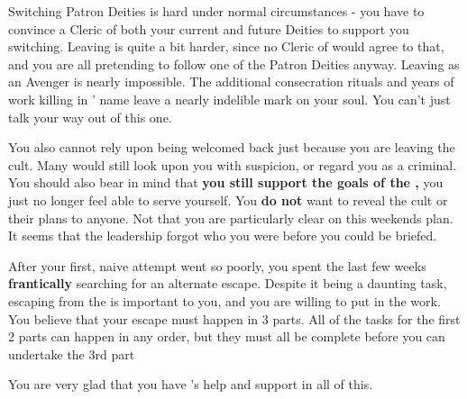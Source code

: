 \documentclass[green]{GL2020}
\begin{document}
\name{\gEscapingFoG{}}

Switching Patron Deities is hard under normal circumstances - you have to convince a Cleric of both your current and future Deities to support you switching. Leaving \cGenesis{} is quite a bit harder, since no Cleric of \cGenesis{} would agree to that, and you are all pretending to follow one of the Patron Deities anyway. Leaving \cGenesis{} as an Avenger is nearly impossible. The additional consecration rituals and years of work killing in \cGenesis{}’ name leave a nearly indelible mark on your soul. You can’t just talk your way out of this one.

You also cannot rely upon being welcomed back just because you are leaving the cult. Many would still look upon you with suspicion, or regard you as a criminal. You should also bear in mind that \textbf{you still support the goals of the \pGoaties{},} you just no longer feel able to serve yourself. You \textbf{do not} want to reveal the cult or their plans to anyone. Not that you are particularly clear on this weekends plan. It seems that the leadership forgot who you were before you could be briefed.

After your first, naive attempt went so poorly, you spent the last few weeks \textbf{frantically} searching for an alternate escape. Despite it being a daunting task, escaping from the \pGoaties{} is important to you, and you are willing to put in the work. You believe that your escape must happen in 3 parts. All of the tasks for the first 2 parts can happen in any order, but they must all be complete before you can undertake the 3rd part

You are very glad that you have \cLibrarian{\full}’s help and support in all of this.
\end{document}
